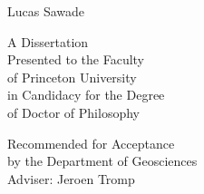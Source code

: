 \begin{titlepage}

\makeatletter
\thispagestyle{empty}
\sc
\vspace*{0in}
\begin{center}
  \LARGE \@title
\end{center}
\vspace{.6in}
\begin{center}
	Lucas Sawade
\end{center}
\vspace{.6in}
\begin{center}
  A Dissertation \\
  Presented to the Faculty \\
  of Princeton University \\
  in Candidacy for the Degree \\
  of Doctor of Philosophy
\end{center}
\vspace{.3in}
\begin{center}
  Recommended for Acceptance \\
  by the Department of Geosciences \\
  Adviser: Jeroen Tromp
\end{center}
\vspace{.3in}
\begin{center}

\@date

\end{center}
\makeatother

\end{titlepage}